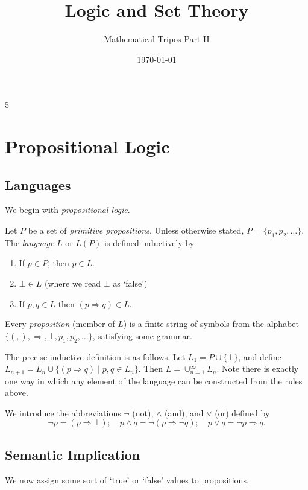 \documentclass[a3paper, 10pt]{article}
\title{Logic and Set Theory}
\author{Mathematical Tripos Part II}
\date{\today}
\renewcommand{\vocab}[1]{\emph{#1}}
\begin{document}
\begin{multicols*}{5}
\maketitle

\section{Propositional Logic}

\subsection{Languages}

We begin with \emph{propositional logic}.

\begin{definition}[Language]
  Let $P$ be a set of \vocab{primitive propositions}. Unless otherwise stated, $P = \{p_1, p_2, \dots\}$. The \vocab{language} $L$ or $L(P)$ is defined inductively by
  \begin{enumerate}
    \item If $p \in P$, then $p \in L$.
    \item $\bot \in L$ (where we read $\bot$ as `false')
    \item If $p, q \in L$ then $(p \Rightarrow q) \in L$.
  \end{enumerate}
\end{definition}

Every \vocab{proposition} (member of $L$) is a finite string of symbols from the alphabet $\{(,),\Rightarrow, \bot, p_1, p_2, \dots\}$, satisfying some grammar.

The precise inductive definition is as follows. Let $L_1 = P \cup \{\bot\}$, and define $L_{n + 1} = L_n \cup \{(p \Rightarrow q) \mid p, q \in L_n\}$. Then $L = \cup_{n = 1}^{\infty} L_n$.
Note there is exactly one way in which any element of the language can be constructed from the rules above.

We introduce the abbreviations $\lnot$ (not), $\land$ (and), and $\lor$ (or) defined by 
$$
\lnot p = (p \Rightarrow \bot); \quad p \land q = \lnot(p \Rightarrow \lnot q); \quad p \lor q = \lnot p \Rightarrow q.
$$

\subsection{Semantic Implication}

We now assign some sort of `true' or `false' values to propositions.


\end{multicols*}
\end{document}

